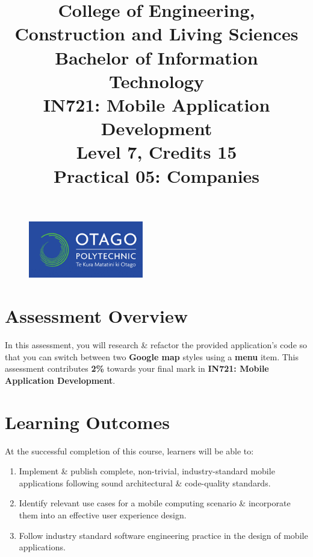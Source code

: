 \documentclass{article}
\author{}
\begin{document}
\begin{figure}
    \centering
    \includegraphics[width=50mm]{./img/logo.png}
\end{figure}

\title{College of Engineering, Construction and Living Sciences\\Bachelor of Information Technology\\IN721: Mobile Application Development\\Level 7, Credits 15\\\textbf{Practical 05: Companies}}
\date{}
\maketitle

\section*{Assessment Overview}
In this assessment, you will research \& refactor the provided application's code so that you can switch between two \textbf{Google map} styles using a \textbf{menu} item. This assessment contributes \textbf{2\%} towards your final mark in \textbf{IN721: Mobile Application Development}.

\section*{Learning Outcomes}
At the successful completion of this course, learners will be able to: 
\begin{enumerate}
	\item Implement \& publish complete, non-trivial, industry-standard mobile applications following sound architectural \& code-quality standards.
	\item Identify relevant use cases for a mobile computing scenario \& incorporate them into an effective user experience design.
	\item Follow industry standard software engineering practice in the design of mobile applications.
\end{enumerate} 
\end{document}
